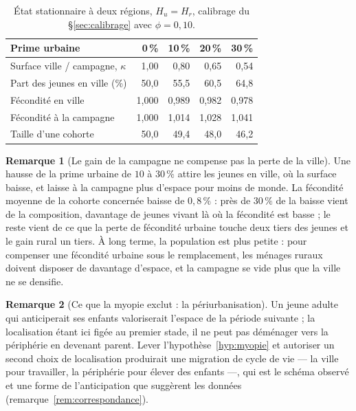 \documentclass[11pt,a4paper]{article}
\theoremstyle{plain}
\theoremstyle{definition}
\newtheorem{remarque}{Remarque}
\begin{document}
\begin{table}[htbp]
\centering\small
\begin{tabular}{@{}lrrrr@{}}
\toprule
Prime urbaine & 0\,\% & 10\,\% & 20\,\% & 30\,\% \\
\midrule
Surface ville / campagne, $\kappa$ & 1,00 & 0,80 & 0,65 & 0,54 \\
Part des jeunes en ville (\%) & 50,0 & 55,5 & 60,5 & 64,8 \\
Fécondité en ville & 1,000 & 0,989 & 0,982 & 0,978 \\
Fécondité à la campagne & 1,000 & 1,014 & 1,028 & 1,041 \\
Taille d'une cohorte & 50,0 & 49,4 & 48,0 & 46,2 \\
\bottomrule
\end{tabular}
\caption{État stationnaire à deux régions, $H_u = H_r$, calibrage du §\ref{sec:calibrage} avec $\phi = 0{,}10$.}\label{tab:regions}
\end{table}

\begin{remarque}[Le gain de la campagne ne compense pas la perte de la ville]\label{rem:exode}
Une hausse de la prime urbaine de $10$ à $30\,\%$ attire les jeunes en ville, où la surface baisse, et laisse à la campagne plus d'espace pour moins de monde. La fécondité moyenne de la cohorte concernée baisse de $0{,}8\,\%$ : près de $30\,\%$ de la baisse vient de la composition, davantage de jeunes vivant là où la fécondité est basse ; le reste vient de ce que la perte de fécondité urbaine touche deux tiers des jeunes et le gain rural un tiers. À long terme, la population est plus petite : pour compenser une fécondité urbaine sous le remplacement, les ménages ruraux doivent disposer de davantage d'espace, et la campagne se vide plus que la ville ne se densifie.
\end{remarque}

\begin{remarque}[Ce que la myopie exclut : la périurbanisation]
Un jeune adulte qui anticiperait ses enfants valoriserait l'espace de la période suivante ; la localisation étant ici figée au premier stade, il ne peut pas déménager vers la périphérie en devenant parent. Lever l'hypothèse~\ref{hyp:myopie} et autoriser un second choix de localisation produirait une migration de cycle de vie — la ville pour travailler, la périphérie pour élever des enfants —, qui est le schéma observé et une forme de l'anticipation que suggèrent les données (remarque~\ref{rem:correspondance}).
\end{remarque}
\end{document}
